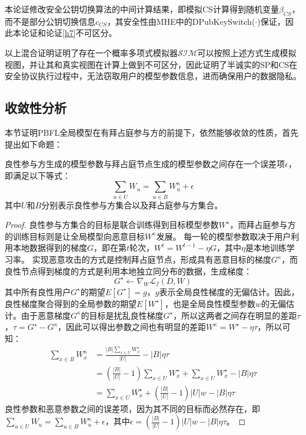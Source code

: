 \begin{hybrid}\label{h8}
	本论证修改安全公钥切换算法的中间计算结果，即模拟CS计算得到随机变量$\beta_{CS}$，而不是部分公钥切换信息$c_{CS}$，其安全性由MHE中的DPubKeySwitch($\cdot$)保证，因此本论证和论证\ref{h7}不可区分。
\end{hybrid}

以上混合证明证明了存在一个概率多项式模拟器$ \mathcal{SIM} $可以按照上述方式生成模拟视图，并让其和真实视图在计算上做到不可区分，因此证明了半诚实的SP和CS在安全协议执行过程中，无法窃取用户的模型参数信息，进而确保用户的数据隐私。


\subsection{收敛性分析}
本节证明PBFL全局模型在有拜占庭参与方的前提下，依然能够收敛的性质，首先提出如下命题：
\begin{proposition}[误差项]\label{pro2}
	良性参与方生成的模型参数与拜占庭节点生成的模型参数之间存在一个误差项$\epsilon$，即满足以下等式：
	$$
		\sum_{u\in U}W_u=   \sum_{u\in B}W_u^{\kappa} + \epsilon	
	$$
	其中$U$和$ B $分别表示良性参与方集合以及拜占庭参与方集合。
\end{proposition}

\begin{proof}
	良性参与方集合的目标是联合训练得到目标模型参数$W^{\star}$，而拜占庭参与方的训练目标则是让全局模型向恶意目标$W^{\kappa}$发展。
	每一轮的模型参数取决于用户利用本地数据得到的梯度$G$，即在第$t$轮次，$W^{t} = W^{t-1} - \eta G$，其中$ \eta $是本地训练学习率。
	实现恶意攻击的方式是控制拜占庭节点，形成具有恶意目标的梯度$G^{\kappa}$，而良性节点得到梯度的方式是利用本地独立同分布的数据，生成梯度：
	$$
		G^{\star} \leftarrow \nabla_{W} \mathcal{L}_{f}(D,W)
	$$
	其中所有良性用户$G^{\star}$的期望$E[G^{\star}]=g$，$g$表示全局良性梯度的无偏估计。因此，良性梯度聚合得到的全局参数的期望$E[W^{\star}]$，也是全局良性模型参数$w$的无偏估计。由于恶意梯度$G^{\kappa}$的目标是扰乱良性梯度$G^{\star}$，所以这两者之间存在明显的差距$\tau$，$\tau = G^{\star}-G^{\kappa}$，因此可以得出参数之间也有明显的差距$W^{\kappa} = W^{\star} - \eta \tau$，所以可知：
	\begin{align*}
		\sum_{x\in B}W_x^{\kappa} & = \frac{|B|\sum_{x\in U}W_x^{\star}}{|U|} - |B|\eta\tau                                \\
		& = (\frac{|B|}{|U|}-1)\sum_{x\in U}W_x^{\star} + \sum_{x\in U}W_x^{\star} - |B|\eta\tau \\
		& = \sum_{x\in U}W_x^{\star} + (\frac{|B|}{|U|}-1)|U|w - |B|\eta\tau
	\end{align*}
	良性参数和恶意参数之间的误差项，因为其不同的目标而必然存在，即$\sum_{u\in U}W_u=   \sum_{u\in B}W_u^{\kappa} + \epsilon$，其中$ \epsilon = (\frac{|B|}{|U|}-1)|U|w - |B|\eta\tau $。
\end{proof}

